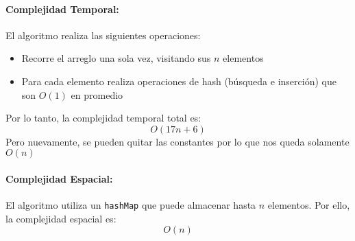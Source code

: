 \paragraph{Complejidad Temporal:}
El algoritmo realiza las siguientes operaciones:
\begin{itemize}
    \item Recorre el arreglo una sola vez, visitando sus $n$ elementos
    \item Para cada elemento realiza operaciones de hash (búsqueda e inserción) que son $O(1)$ en promedio
\end{itemize}
Por lo tanto, la complejidad temporal total es:
\[
O(17n+6)
\]
Pero nuevamente, se pueden quitar las constantes por lo que nos queda solamente $O(n)$

\paragraph{Complejidad Espacial:}
El algoritmo utiliza un \texttt{hashMap} que puede almacenar hasta $n$ elementos. Por ello, la complejidad espacial es:
\[
O(n)
\]

